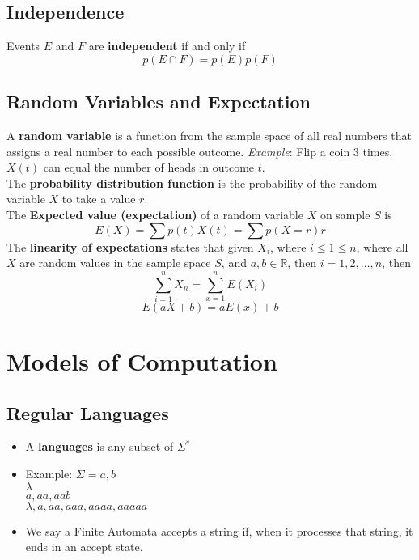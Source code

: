 \documentclass[letter]{article}
\begin{document}
\begin{multicols}{2}
	\subsection{Independence}
	Events $E$ and $F$ are \textbf{independent} if and only if
	$$p(E \cap F) = p(E)p(F)$$
	\subsection{Random Variables and Expectation}
	A \textbf{random variable} is a function from the sample space of all real
	numbers that assigns a real number to each possible outcome.
	\textit{Example}: Flip a coin $3$ times. $X(t)$ can equal the number of heads
	in outcome $t$. \\
	The \textbf{probability distribution function} is the probability of the
	random variable $X$ to take a value $r$. \\
	The \textbf{Expected value (expectation)} of a random variable $X$ on sample
	$S$ is
	$$E(X) = \sum p(t)X(t) = \sum p(X = r)r$$
	The \textbf{linearity of expectations} states that given $X_i$, where
	$i \leq 1 \leq n$, where all $X$ are random values in the sample space $S$,
	and $a, b \in \mathbb{R}$, then
	$i = 1, 2, \ldots, n$, then
	$$\sum_{i = 1}^n X_n = \sum_{x = 1}^n E(X_i)$$
	$$E(aX + b) = aE(x) + b$$

	\section{Models of Computation}
	\subsection{Regular Languages}
	\begin{itemize}
		\item A \textbf{languages} is any subset of $\Sigma^*$
		\item Example: $\Sigma = {a, b}$ \\
					${\lambda}$ \\
					${a, aa, aab}$ \\
					${\lambda, a, aa, aaa, aaaa, aaaaa}$ \\
		\item We say a Finite Automata accepts a string if, when it processes that
					string, it ends in an accept state.
	\end{itemize}

\end{multicols}
\end{document}
